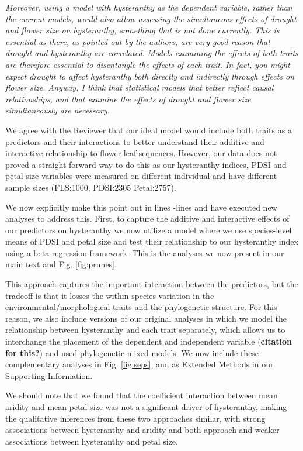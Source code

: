 \documentclass{article}[12pt]
\begin{document}
\emph{Moreover, using a model with hysteranthy as the dependent variable, rather than the current models, would also allow assessing the simultaneous effects of drought and flower size on hysteranthy, something that is not done currently. This is essential as there, as pointed out by the authors, are very good reason that drought and hysteranthy are correlated. Models examining the effects of both traits are therefore essential to disentangle the effects of each trait. In fact, you might expect drought to affect hysteranthy both directly and indirectly through effects on flower size. Anyway, I think that statistical models that better reflect causal relationships, and that examine the effects of drought and flower size simultaneously are necessary.}

We agree with the Reviewer that our ideal model would include both traits as a predictors and their interactions to better understand their additive and interactive relationship to flower-leaf sequences. However, our data does not proved a straight-forward way to do this as our  hysteranthy indices, PDSI and petal size variables were measured on different individual and have different sample sizes (FLS:1000, PDSI:2305 Petal:2757).

We now explicitly make this point out in lines -lines  and have executed new analyses to address this. First, to capture the additive and interactive effects of our predictors on hysteranthy we now utilize a model where we use species-level means of PDSI and petal size and test their relationship to our hysteranthy index using a beta regression framework. This is the analyses we now present in our main text and Fig. \ref{fig:prunes}.

This approach captures the important interaction between the predictors, but the tradeoff is that it losses the within-species variation in the environmental/morphological traits and the phylogenetic structure. For this reason, we also include versions of our original analyses in which we model the relationship between hysteranthy and each trait separately, which allows us to interchange the placement of the dependent and independent variable (\textbf{citation for this?}) and used phylogenetic mixed models. We now include these complementary analyses in Fig. \ref{fig:seps}, and as Extended Methods in our Supporting Information.

We should note that we found that the coefficient interaction between mean aridity and mean petal size was not a significant driver of hysteranthy, making the qualitative inferences from these two approaches similar, with strong associations between hysteranthy and aridity and both approach and weaker associations between hysteranthy and petal size. 
\end{document}
